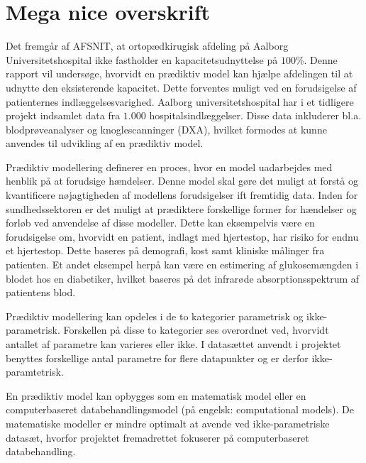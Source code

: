 \section{Mega nice overskrift}

Det fremgår af AFSNIT, at ortopædkirugisk afdeling på Aalborg Universitetshospital ikke fastholder en kapacitetsudnyttelse på $100$\%. Denne rapport vil undersøge, hvorvidt en prædiktiv model kan hjælpe afdelingen til at udnytte den eksisterende kapacitet. Dette forventes muligt ved en forudsigelse af patienternes indlæggelsesvarighed. Aalborg universitetshospital har i et tidligere projekt indsamlet data fra $1.000$ hospitalsindlæggelser. Disse data inkluderer bl.a. blodprøveanalyser og knoglescanninger (DXA), hvilket formodes at kunne anvendes til udvikling af en prædiktiv model. 

\noindent
Prædiktiv modellering definerer en proces, hvor en model uadarbejdes med henblik på at forudsige hændelser. Denne model skal gøre det muligt at forstå og kvantificere nøjagtigheden af modellens forudsigelser ift fremtidig data.\cite{Kuhn2013} 
Inden for sundhedssektoren er det muligt at prædiktere forskellige former for hændelser og forløb ved anvendelse af disse modeller. Dette kan eksempelvis være en forudsigelse om, hvorvidt en patient, indlagt med hjertestop, har risiko for endnu et hjertestop. Dette baseres på demografi, kost samt kliniske målinger fra patienten. Et andet eksempel herpå kan være en estimering af glukosemængden i blodet hos en diabetiker, hvilket baseres på det infrarøde absorptionsspektrum af patientens blod.\cite{Hastie2008}

\noindent
Prædiktiv modellering kan opdeles i de to kategorier parametrisk og ikke-parametrisk. Forskellen på disse to kategorier ses overordnet ved, hvorvidt antallet af parametre kan varieres eller ikke. I datasættet anvendt i projektet benyttes forskellige antal parametre for flere datapunkter og er derfor ikke-paramtetrisk.\cite{Sheskin2000}

\noindent
En prædiktiv model kan opbygges som en matematisk model eller en computerbaseret databehandlingsmodel (på engelsk: computational models). De matematiske modeller er mindre optimalt at avende ved ikke-parametriske datasæt, hvorfor projektet fremadrettet fokuserer på computerbaseret databehandling. 